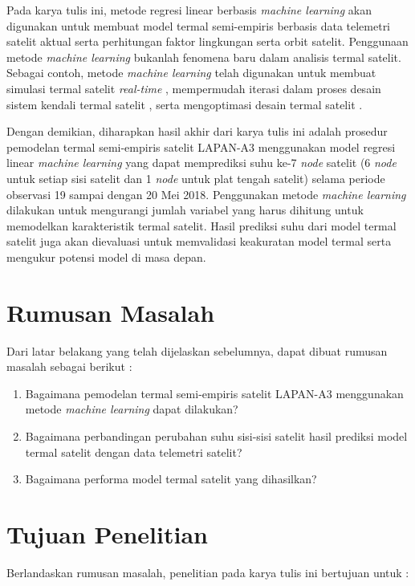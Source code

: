 Pada karya tulis ini, metode regresi linear berbasis \textit{machine learning} akan
digunakan untuk membuat model termal semi-empiris berbasis data telemetri
satelit aktual serta perhitungan faktor lingkungan serta orbit satelit.
Penggunaan metode \textit{machine learning} bukanlah fenomena baru dalam analisis termal
satelit. Sebagai contoh, metode \textit{machine learning} telah digunakan untuk membuat
simulasi termal satelit \textit{real-time} \cite{junior2017}, mempermudah
iterasi dalam proses desain sistem kendali termal satelit \cite{escobar2016},
serta mengoptimasi desain termal satelit \cite{xiong2020}.

Dengan demikian, diharapkan hasil akhir dari karya tulis ini adalah prosedur
pemodelan termal semi-empiris satelit LAPAN-A3 menggunakan model regresi linear
\textit{machine learning} yang dapat memprediksi suhu ke-7 \textit{node} satelit (6 \textit{node} untuk
setiap sisi satelit dan 1 \textit{node} untuk plat tengah satelit) selama periode
observasi 19 sampai dengan 20 Mei 2018. Penggunakan metode \textit{machine learning}
dilakukan untuk mengurangi jumlah variabel yang harus dihitung untuk memodelkan
karakteristik termal satelit. Hasil prediksi suhu dari model termal satelit
juga akan dievaluasi untuk memvalidasi keakuratan model termal serta mengukur
potensi model di masa depan.

\section{Rumusan Masalah}

Dari latar belakang yang telah dijelaskan sebelumnya, dapat dibuat rumusan masalah sebagai berikut :

\begin{enumerate}
\item Bagaimana pemodelan termal semi-empiris satelit LAPAN-A3 menggunakan metode \textit{machine learning} dapat dilakukan?
\item Bagaimana perbandingan perubahan suhu sisi-sisi satelit hasil prediksi model termal satelit dengan data telemetri satelit?
\item Bagaimana performa model termal satelit yang dihasilkan?
\end{enumerate}

\section{Tujuan Penelitian}

Berlandaskan rumusan masalah, penelitian pada karya tulis ini bertujuan untuk :

